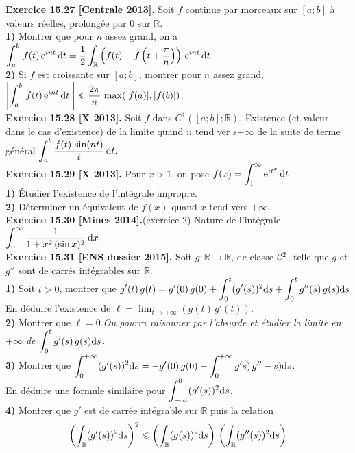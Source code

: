\documentclass[a4paper,12pt,francais]{article}
\newcommand{\field}[1]{\mathbb{#1}}
\newcommand{\R}{\field{R}}
\newcommand{\e}{\mbox{e}}
\begin{document}
\noindent
{\bf Exercice 15.27 [Centrale 2013].} Soit $f$ continue par morceaux sur $[a;b]$ à valeurs réelles, prolongée par $0$ sur $\R$.\\
{\bf 1)} Montrer que pour $n$ assez grand, on a $\displaystyle \int_a^b \, f(t)\, \e^{int} \, {\rm d}t 
=\frac{1}{2} \int_\R \left({
f(t)-f \left({ t+\frac{\pi}{n} }\right) }\right) \, \e^{int}\, {\rm d}t$\\
{\bf 2)} Si $f$ est croissante sur $[a;b]$, montrer pour $n$ assez grand, $\displaystyle 
\left|{ \int_a^b \, f(t)\, \e^{int} \, {\rm d}t \; }\right| 
\leqslant \frac{2\pi}{n} \, \max(|f(a)|,|f(b)|)$.\\

\noindent
{\bf Exercice 15.28 [X 2013].} Soit $f$ dans $C^1([a;b];\R)$. Existence (et valeur dans le cas d'existence) de la limite quand $n$ tend ver s$+\infty$ de la suite de terme général $\displaystyle \int_a^b \frac{f(t)\, \sin(nt)}{t} \, {\rm d}t.$\\

\noindent
{\bf Exercice 15.29 [X 2013].} Pour $x>1$, on pose $f(x)=\displaystyle \int_1^\infty \e^{it^x}\, {\rm d}t$\\
{\bf 1)} \'Etudier l'existence de l'intégrale impropre.\\
{\bf 2)} Déterminer un équivalent de $f(x)$ quand $x$ tend vers $+\infty$.\\

\noindent %
{\bf Exercice 15.30 [Mines 2014].}(exercice 2) Nature de l'intégrale $\displaystyle \int_0^\infty \frac{1}{1+x^2\, (\sin x)^2 } \, {\rm d}x$ \\

\noindent  %
{\bf Exercice 15.31 [ENS dossier 2015].}
Soit $g:\R \to \R$, de classe ${\cal{C}}^2$, telle que $g$ et $g''$ sont de carrés intégrables sur $\R$.\\
{\bf 1)} Soit $t>0$, montrer que
$\displaystyle g'(t)\, g(t)=g'(0)\, g(0)+\int_0^t (g'(s))^2 {\rm d}s +\int_0^t g''(s) \, g(s) {\rm d}s$\\
En déduire l'existence de $\displaystyle \ell=\lim_{t \to +\infty} \left( g(t)\, g'(t) \right)$.\\
{\bf 2)} Montrer que $\ell=0$.{\it On pourra raisonner par l'absurde et étudier la limite en $+\infty$ de $\displaystyle \int_0^t g'(s) \, g(s){\rm d}s$.}\\
{\bf 3)} Montrer que $\displaystyle \int_0^{+\infty} (g'(s))^2 {\rm d}s= -g'(0)\, g(0) - \int_0^{+\infty} g's)\, g''-s) {\rm d}s$.\\
En déduire une formule similaire pour $\displaystyle \int_{-\infty}^0 (g'(s))^2 {\rm d}s$.\\
{\bf 4)} Montrer que $g'$ est de carrée intégrable sur $\R$ puis la relation 
$$\left( \int_{\R} (g'(s))^2 {\rm d}s \right)^2 \leqslant \left( \int_{\R} (g(s))^2 {\rm d}s \right) \,  \left( \int_{\R} (g''(s))^2 {\rm d}s \right)$$
\end{document}
